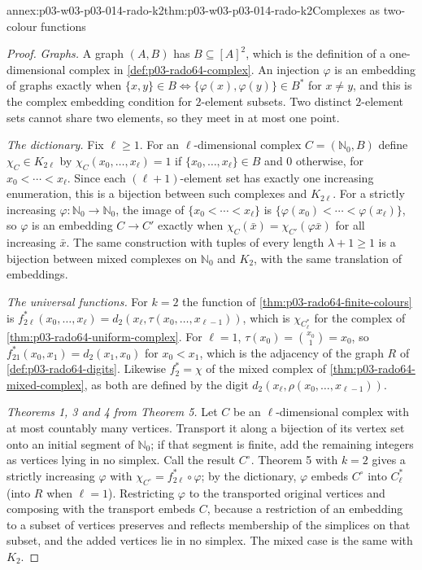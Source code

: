 \begin{annexitem}{annex:p03-w03-p03-014-rado-k2}{thm:p03-w03-p03-014-rado-k2}{Complexes as two-colour functions}
\begin{proof}
\emph{Graphs.} A graph \((A,B)\) has \(B\subseteq[A]^2\), which is the
definition of a one-dimensional complex in
\cref{def:p03-rado64-complex}. An injection \(\varphi\) is an embedding
of graphs exactly when \(\{x,y\}\in B\iff\{\varphi(x),\varphi(y)\}\in B^*\)
for \(x\neq y\), and this is the complex embedding condition for
\(2\)-element subsets. Two distinct \(2\)-element sets cannot share two
elements, so they meet in at most one point.

\emph{The dictionary.} Fix \(\ell\geq1\). For an \(\ell\)-dimensional
complex \(C=(\mathbb N_0,B)\) define \(\chi_C\in K_{2\ell}\) by
\(\chi_C(x_0,\ldots,x_\ell)=1\) if \(\{x_0,\ldots,x_\ell\}\in B\) and
\(0\) otherwise, for \(x_0<\cdots<x_\ell\). Since each
\((\ell+1)\)-element set has exactly one increasing enumeration, this is a
bijection between such complexes and \(K_{2\ell}\). For a strictly
increasing \(\varphi:\mathbb N_0\to\mathbb N_0\), the image of
\(\{x_0<\cdots<x_\ell\}\) is \(\{\varphi(x_0)<\cdots<\varphi(x_\ell)\}\),
so \(\varphi\) is an embedding \(C\to C'\) exactly when
\(\chi_C(\bar x)=\chi_{C'}(\varphi\bar x)\) for all increasing
\(\bar x\). The same construction with tuples of every length
\(\lambda+1\geq1\) is a bijection between mixed complexes on
\(\mathbb N_0\) and \(K_2\), with the same translation of embeddings.

\emph{The universal functions.} For \(k=2\) the function of
\cref{thm:p03-rado64-finite-colours} is
\(f^*_{2\ell}(x_0,\ldots,x_\ell)=d_2(x_\ell,\tau(x_0,\ldots,x_{\ell-1}))\),
which is \(\chi_{C^*_\ell}\) for the complex of
\cref{thm:p03-rado64-uniform-complex}. For \(\ell=1\),
\(\tau(x_0)=\binom{x_0}{1}=x_0\), so \(f^*_{21}(x_0,x_1)=d_2(x_1,x_0)\)
for \(x_0<x_1\), which is the adjacency of the graph \(R\) of
\cref{def:p03-rado64-digits}. Likewise \(f^*_2=\chi\) of the mixed complex
of \cref{thm:p03-rado64-mixed-complex}, as both are defined by the digit
\(d_2(x_\ell,\rho(x_0,\ldots,x_{\ell-1}))\).

\emph{Theorems 1, 3 and 4 from Theorem 5.} Let \(C\) be an
\(\ell\)-dimensional complex with at most countably many vertices.
Transport it along a bijection of its vertex set onto an initial segment
of \(\mathbb N_0\); if that segment is finite, add the remaining
integers as vertices lying in no simplex. Call the result \(C^\circ\).
Theorem 5 with \(k=2\) gives a strictly increasing \(\varphi\) with
\(\chi_{C^\circ}=f^*_{2\ell}\circ\varphi\); by the dictionary,
\(\varphi\) embeds \(C^\circ\) into \(C^*_\ell\) (into \(R\) when
\(\ell=1\)). Restricting \(\varphi\) to the transported original
vertices and composing with the transport embeds \(C\), because a
restriction of an embedding to a subset of vertices preserves and
reflects membership of the simplices on that subset, and the added
vertices lie in no simplex. The mixed case is the same with \(K_2\).
\end{proof}
\end{annexitem}
